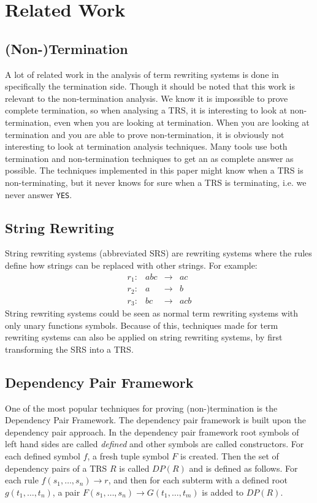 \newcommand\TTTT{%
 \textsf{T\kern-0.15em\raisebox{-0.55ex}T\kern-0.15emT\kern-0.15em\raisebox{-0.55ex}2\kern.15em}%
}
\newcommand\TTT{%
 \textsf{T\kern-0.15em\raisebox{-0.55ex}T\kern-0.15emT}%
}

\chapter{Related Work}\label{relatedwork}
\section{(Non-)Termination}
A lot of related work in the analysis of term rewriting systems is done in specifically the termination side. Though it should be noted that this work is relevant to the non-termination analysis. We know it is impossible to prove complete termination, so when analysing a TRS, it is interesting to look at non-termination, even when you are looking at termination. When you are looking at termination and you are able to prove non-termination, it is obviously not interesting to look at termination analysis techniques. Many tools use both termination and non-termination techniques to get an as complete answer as possible. The techniques implemented in this paper might know when a TRS is non-terminating, but it never knows for sure when a TRS is terminating, i.e. we never answer \texttt{YES}.

\section{String Rewriting}
String rewriting systems (abbreviated SRS) are rewriting systems where the rules define how strings can be replaced with other strings. For example:
\[
\begin{array}{lrcl}
    r_1: & abc & \rightarrow & ac \\
    r_2: & a & \rightarrow & b \\
    r_3: & bc & \rightarrow & acb
\end{array}
\]
String rewriting systems could be seen as normal term rewriting systems with only unary functions symbols. Because of this, techniques made for term rewriting systems can also be applied on string rewriting systems, by first transforming the SRS into a TRS. 

\section{Dependency Pair Framework}
One of the most popular techniques for proving (non-)termination is the Dependency Pair Framework\cite{thiemann2007dp}. The dependency pair framework is built upon the dependency pair approach\cite{arts2000termination}. In the dependency pair framework root symbols of left hand sides are called \textit{defined} and other symbols are called constructors. For each defined symbol $f$, a fresh tuple symbol $F$ is created. Then the set of dependency pairs of a TRS $R$ is called $\textit{DP}(R)$ and is defined as follows. For each rule $f(s_1, \dots, s_n) \rightarrow r$, and then for each subterm with a defined root $g(t_1, \dots, t_n)$, a pair $F(s_1, \dots, s_n) \rightarrow G(t_1, \dots, t_m)$ is added to $\textit{DP}(R)$. 

